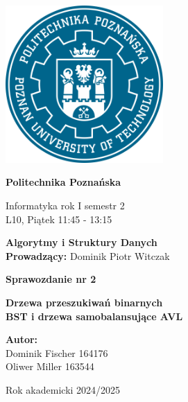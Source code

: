 \documentclass{article}
\begin{document}
	\begin{center}
		\includegraphics[width=6cm]{Image/PP-PUT-LOGO.png}
		\vspace{1cm}
		
		{\Huge\bfseries Politechnika Poznańska}
		
		\vspace{1cm}
		
		{\large Informatyka rok I semestr 2} \\[0.3cm]
		L10, Piątek 11:45 - 13:15
		
		\vspace{1.5cm}
		
		{\LARGE\bfseries Algorytmy i Struktury Danych} \\[0.3cm]
		\textbf{Prowadzący:} Dominik Piotr Witczak
		
		\vspace{2cm}
		
		{\LARGE\bfseries Sprawozdanie nr 2} 
		
		\vspace{1cm}
		
		{\Large\bfseries Drzewa przeszukiwań binarnych \\
			BST i drzewa samobalansujące AVL}
		
		\vspace{3cm}
		
		\begin{flushright}
			\textbf{Autor:} \\[0.2cm]
			Dominik Fischer 164176 \\
			Oliwer Miller 163544
		\end{flushright}
		
		\vspace{1.5cm}
		Rok akademicki 2024/2025
	\end{center}
	
	
	
	\newpage
	
\end{document}

